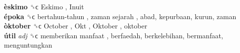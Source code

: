 \textbf{èskimo} ␝ϲ   Eskimo ,  Inuit   \\
\textbf{époka} ␝ϲ   bertahun-tahun ,  zaman sejarah , abad, kepurbaan, kurun, zaman  \\
\textbf{òktober} ␝ϲ   October ,  Okt ,  Oktober , oktober  \\
\textbf{útil} \emph{adj}  ␝ϲ   memberikan manfaat , berfaedah, berkelebihan, bermanfaat, menguntungkan  \\
